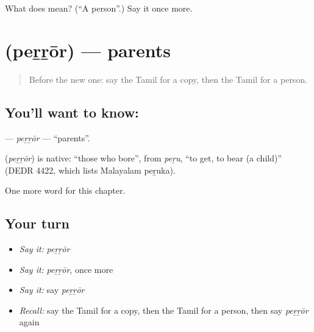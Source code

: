 \begin{tcolorbox}[breakable,colback=teal!4,colframe=teal!35!black,title={Before you move on}]
What does  mean? (\textquotedblleft{}A person\textquotedblright{}.) Say it once more.
\end{tcolorbox}
\section[\texorpdfstring{\ta{பெற்றோர்} (peṟṟōr)}{பெற்றோர் (peṟṟōr)}]{ (peṟṟōr) — parents}

\label{lesson:TA-C273-perror}



\begin{quote}
Before the new one: say the Tamil for a copy, then the Tamil for a person.
\end{quote}

\subsection*{You'll want to know: }
\textbf{} — \emph{peṟṟōr} — \textquotedblleft{}parents\textquotedblright{}.

\begin{cousinweb}
\textbf{} (\emph{peṟṟōr}) is native: \textquotedblleft{}those who bore\textquotedblright{}, from \emph{peṟu}, \textquotedblleft{}to get, to bear (a child)\textquotedblright{} (DEDR 4422, which lists Malayalam peṟuka).
\end{cousinweb}

\begin{grammarlens}[title={What you've built}]
One more word for this chapter.
\end{grammarlens}

\subsection*{Your turn}
\begin{itemize}
\raggedright
  \item \emph{Say it:} \emph{peṟṟōr}
  \item \emph{Say it:} \emph{peṟṟōr}, once more
  \item \emph{Say it:} say \emph{peṟṟōr}
  \item \emph{Recall:} say the Tamil for a copy, then the Tamil for a person, then say \emph{peṟṟōr} again
\end{itemize}

